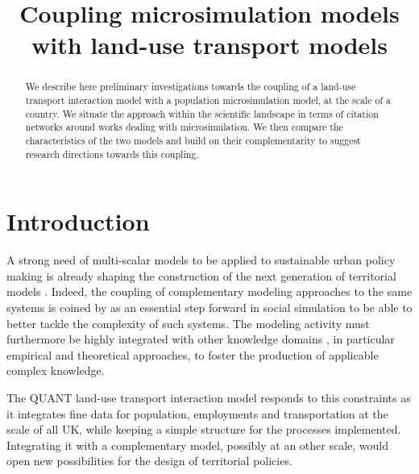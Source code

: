 \documentclass[11pt]{article}
\begin{document}
\title{Coupling microsimulation models with land-use transport models}

\date{}

\maketitle

\justify


\begin{abstract}
	We describe here preliminary investigations towards the coupling of a land-use transport interaction model with a population microsimulation model, at the scale of a country. We situate the approach within the scientific landscape in terms of citation networks around works dealing with microsimulation. We then compare the characteristics of the two models and build on their complementarity to suggest research directions towards this coupling. 
\end{abstract}




\section{Introduction}


A strong need of multi-scalar models to be applied to sustainable urban policy making is already shaping the construction of the next generation of territorial models \cite{Rozenblat2018}. Indeed, the coupling of complementary modeling approaches to the same systems is coined by \cite{banos2013pour} as an essential step forward in social simulation to be able to better tackle the complexity of such systems. The modeling activity must furthermore be highly integrated with other knowledge domains \cite{raimbault2017applied}, in particular empirical and theoretical approaches, to foster the production of applicable complex knowledge.

The QUANT land-use transport interaction model \cite{batty2019generalized} responds to this constraints as it integrates fine data for population, employments and transportation at the scale of all UK, while keeping a simple structure for the processes implemented. Integrating it with a complementary model, possibly at an other scale, would open new possibilities for the design of territorial policies.
\end{document}
